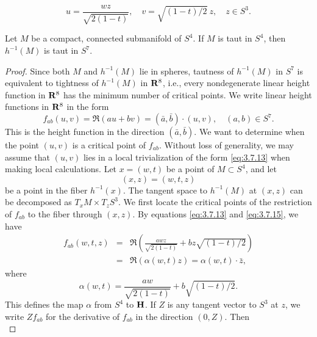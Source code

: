 \documentclass[10pt,a4paper]{amsart}
\begin{document}
\begin{equation} 
\label{eq:3.7.13}
u = \frac{wz}{\sqrt{2(1-t)}}, \quad v = \sqrt{(1-t)/2}\  z, \quad z \in S^3.
\end{equation}

\begin{theorem}
\label{thm:3.7.1} 
Let $M$ be a compact, connected submanifold of $S^4$.  If $M$ is taut in $S^4$, then $h^{-1}(M)$ is taut in $S^7$.
\end{theorem}

\begin{proof}
Since both $M$ and $h^{-1}(M)$ lie in spheres, tautness of $h^{-1}(M)$ in $S^7$ is equivalent to tightness of
$h^{-1}(M)$ in ${\bf R}^8$, i.e., every nondegenerate linear 
height function in ${\bf R}^8$ has the minimum number
of critical points.  We write linear height functions in ${\bf R}^8$ in the form
\begin{equation} 
\label{eq:3.7.15}
f_{ab} (u,v) = \Re (au + bv) = (\bar{a}, \bar{b}) \cdot (u,v), \quad (a,b) \in S^7.
\end{equation}
This is the height function in the direction $(\bar{a}, \bar{b})$.  We want to determine when the point $(u,v)$
is a critical point of $f_{ab}$.  Without loss of generality, we may assume that $(u,v)$ lies in a local
trivialization of the form \eqref{eq:3.7.13} when making local calculations.  Let $x = (w,t)$ be a point of
$M \subset S^4$, and let 
\begin{displaymath}
(x,z) = (w,t,z)
\end{displaymath}
be a point in the fiber $h^{-1}(x)$.  The tangent space to $h^{-1}(M)$
at $(x,z)$ can be decomposed as $T_x M \times T_z S^3$.  We first locate the critical points of the restriction of 
$f_{ab}$ to the fiber through $(x,z)$.  By equations \eqref{eq:3.7.13} and \eqref{eq:3.7.15}, we have
\begin{eqnarray} 
\label{eq:3.7.16}
f_{ab} (w,t,z) & = & \Re \left(\frac{awz}{\sqrt{2(1-t)}} + bz \sqrt{(1-t)/2} \right) \\
& = & \Re (\alpha (w,t) z) = \alpha (w,t) \cdot \bar{z}, \nonumber
\end{eqnarray}
where
\begin{displaymath}
\alpha (w,t) = \frac{aw}{\sqrt{2(1-t)}} + b \sqrt{(1-t)/2}.
\end{displaymath}
This defines the map $\alpha$ from $S^4$ to ${\bf H}$.  If $Z$ is any tangent vector to $S^3$ at $z$, we write
$Zf_{ab}$ for the derivative of $f_{ab}$ in the direction $(0,Z)$.  Then
\begin{equation} 

\end{equation}
\end{proof}
\end{document}
